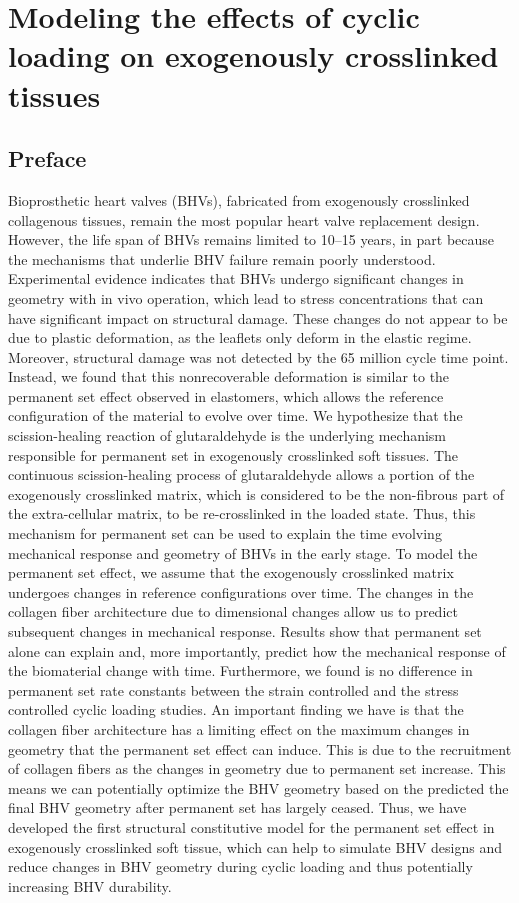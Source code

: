 \chapter{Modeling the effects of cyclic loading on exogenously cross\Hyphdash linked tissues}

\section*{Preface}
%

    Bioprosthetic heart valves (BHVs), fabricated from exogenously crosslinked collagenous tissues, remain the most popular heart valve replacement design. However, the life span of BHVs remains limited to 10–15 years, in part because the mechanisms that underlie BHV failure remain poorly understood. Experimental evidence indicates that BHVs undergo significant changes in geometry with in vivo operation, which lead to stress concentrations that can have significant impact on structural damage. These changes do not appear to be due to plastic deformation, as the leaflets only deform in the elastic regime. Moreover, structural damage was not detected by the 65 million cycle time point. Instead, we found that this nonrecoverable deformation is similar to the permanent set effect observed in elastomers, which allows the reference configuration of the material to evolve over time. We hypothesize that the scission-healing reaction of glutaraldehyde is the underlying mechanism responsible for permanent set in exogenously crosslinked soft tissues. The continuous scission-healing process of glutaraldehyde allows a portion of the exogenously crosslinked matrix, which is considered to be the non-fibrous part of the extra-cellular matrix, to be re-crosslinked in the loaded state. Thus, this mechanism for permanent set can be used to explain the time evolving mechanical response and geometry of BHVs in the early stage. To model the permanent set effect, we assume that the exogenously crosslinked matrix undergoes changes in reference configurations over time. The changes in the collagen fiber architecture due to dimensional changes allow us to predict subsequent changes in mechanical response. Results show that permanent set alone can explain and, more importantly, predict how the mechanical response of the biomaterial change with time. Furthermore, we found is no difference in permanent set rate constants between the strain controlled and the stress controlled cyclic loading studies. An important finding we have is that the collagen fiber architecture has a limiting effect on the maximum changes in geometry that the permanent set effect can induce. This is due to the recruitment of collagen fibers as the changes in geometry due to permanent set increase. This means we can potentially optimize the BHV geometry based on the predicted the final BHV geometry after permanent set has largely ceased. Thus, we have developed the first structural constitutive model for the permanent set effect in exogenously crosslinked soft tissue, which can help to simulate BHV designs and reduce changes in BHV geometry during cyclic loading and thus potentially increasing BHV durability.
    
